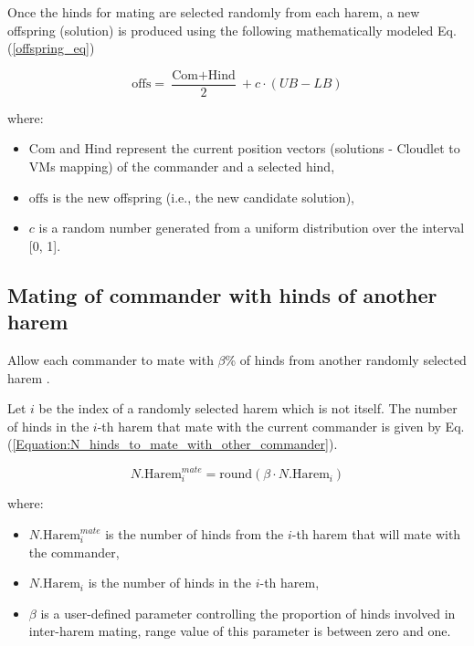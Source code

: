 \documentclass[pdflatex,sn-mathphys-num]{sn-jnl}%
\begin{document}
Once the hinds for mating are selected randomly from each harem, a new offspring (solution) is produced using the following mathematically modeled Eq. (\ref{offspring_eq})

\begin{equation}\label{offspring_eq}
\text{offs} = \frac{\text{Com} + \text{Hind}}{2} + c \cdot (UB - LB)
\end{equation}\label{offspring}

\noindent where:
\begin{itemize}
    \item $\text{Com}$ and $\text{Hind}$ represent the current position vectors (solutions - Cloudlet to VMs mapping) of the commander and a selected hind,
    \item $\text{offs}$ is the new offspring (i.e., the new candidate solution),
    \item $c$ is a random number generated from a uniform distribution over the interval [0, 1].
\end{itemize}


\subsection{Mating of commander with hinds of another harem}\label{subsec4.7}
Allow each commander to mate with $\beta$\% of hinds from another randomly selected harem \cite{red_deer}. 

Let $i$ be the index of a randomly selected harem which is not itself. The number of hinds in the $i$-th harem that mate with the current commander is given by Eq. (\ref{Equation:N_hinds_to_mate_with_other_commander}).

\begin{equation}\label{Equation:N_hinds_to_mate_with_other_commander}
N.{\text{Harem}_i^{mate}} = \text{round}( \beta \cdot N.{\text{Harem}_i} )
\end{equation}

\noindent where:
\begin{itemize}
    \item $N.{\text{Harem}_i^{mate}}$ is the number of hinds from the $i$-th harem that will mate with the commander,
    \item $N.{\text{Harem}_i}$ is the number of hinds in the $i$-th harem,
    \item $\beta$ is a user-defined parameter controlling the proportion of hinds involved in inter-harem mating, range value of this parameter is between zero and one.
\end{itemize}
\end{document}
